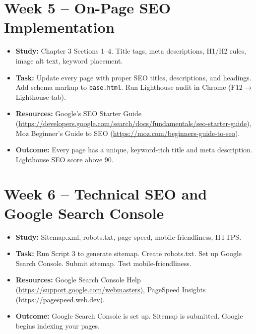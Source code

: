 \documentclass[12pt, a4paper]{book}
\begin{document}
\section{Week 5 -- On-Page SEO Implementation}
\begin{itemize}[leftmargin=1.5em]
  \item \textbf{Study:} Chapter 3 Sections 1--4. Title tags, meta descriptions, H1/H2 rules,
        image alt text, keyword placement.
  \item \textbf{Task:} Update every page with proper SEO titles, descriptions, and headings.
        Add schema markup to \texttt{base.html}. Run Lighthouse audit in Chrome (F12 → Lighthouse tab).
  \item \textbf{Resources:} Google's SEO Starter Guide (\url{https://developers.google.com/search/docs/fundamentals/seo-starter-guide}),
        Moz Beginner's Guide to SEO (\url{https://moz.com/beginners-guide-to-seo}).
  \item \textbf{Outcome:} Every page has a unique, keyword-rich title and meta description.
        Lighthouse SEO score above 90.
\end{itemize}

\section{Week 6 -- Technical SEO and Google Search Console}
\begin{itemize}[leftmargin=1.5em]
  \item \textbf{Study:} Sitemap.xml, robots.txt, page speed, mobile-friendliness, HTTPS.
  \item \textbf{Task:} Run Script 3 to generate sitemap. Create robots.txt. Set up
        Google Search Console. Submit sitemap. Test mobile-friendliness.
  \item \textbf{Resources:} Google Search Console Help (\url{https://support.google.com/webmasters}),
        PageSpeed Insights (\url{https://pagespeed.web.dev}).
  \item \textbf{Outcome:} Google Search Console is set up. Sitemap is submitted.
        Google begins indexing your pages.
\end{itemize}
\end{document}
